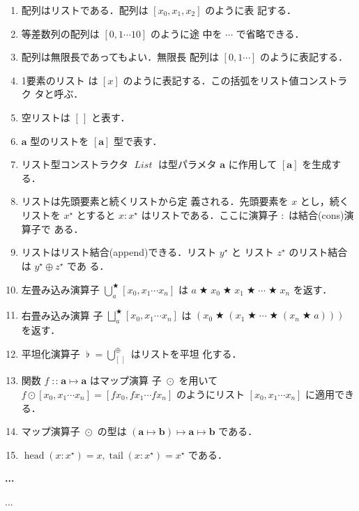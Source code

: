 \documentclass[a5paper,twoside,fleqn]{jsbook}
\newenvironment{note}[1]{\begin{boxnote}\begin{center}\textbf{#1}\end{center}}{\end{boxnote}}
\newcommand{\mEmptyList}{{[\,]}}
\newcommand{\mSpecialFunc}[1]{\mathrm{#1}}
\DeclareMathOperator{\mHead}{\mSpecialFunc{head}}
\DeclareMathOperator{\mTail}{\mSpecialFunc{tail}}
\DeclareMathOperator{\mAppend}{\oplus}
\DeclareMathOperator{\mBinOp}{\bigstar}
\DeclareMathOperator{\mConcat}{\flat}
\DeclareMathOperator*{\mFold}{\bigcup}
\DeclareMathOperator*{\mFoldRight}{\bigsqcup}
\DeclareMathOperator{\mIn}{{:\!:}}
\DeclareMathOperator{\mMapList}{\odot}
\DeclareMathOperator{\mMapsTo}{\mapsto}
\newcommand{\mType}[1]{\mathbf{#1}}
\newcommand{\mListType}[1]{[\mType{#1}]}
\newcommand{\mTypeConstructor}[1]{\textit{#1}}
\DeclareMathOperator{\mListTypeConstructor}{\mTypeConstructor{List}}
\newcommand{\mListWith}[1]{\left[#1\right]}
\newcommand{\mList}[1]{{#1}^\mathrm{\star}}
\newcommand{\mProj}[2]{#1\mMapsTo#2}
\begin{document}
\begin{enumerate}
\item 配列はリストである．配列は $\mListWith{x_0,x_1,x_2}$ のように表
  記する．\item 等差数列の配列は $\mListWith{0,1\dotsb10}$ のように途
  中を $\dotsb$ で省略できる．\item 配列は無限長であってもよい．無限長
  配列は $\mListWith{0,1\dotsb}$ のように表記する．\item 1要素のリスト
  は $\mListWith{x}$ のように表記する．この括弧をリスト値コンストラク
  タと呼ぶ．\item 空リストは $\mEmptyList$ と表す．\item $\mType{a}$
  型のリストを $\mListType{a}$ 型で表す．\item リスト型コンストラクタ
  $\mListTypeConstructor$ は型パラメタ $\mType{a}$ に作用して
  $\mListType{a}$ を生成する．\item リストは先頭要素と続くリストから定
  義される．先頭要素を $x$ とし，続くリストを $\mList{x}$ とすると
  $x:\mList{x}$ はリストである．ここに演算子 $:$ は結合(cons)演算子で
  ある．\item リストはリスト結合(append)できる．リスト $\mList{y}$ と
  リスト $\mList{z}$ のリスト結合は $\mList{y}\mAppend\mList{z}$ であ
  る．\item 左畳み込み演算子
  $\mFold^{\mBinOp}_a\mListWith{x_0,x_1\dotsb x_n}$ は $a\mBinOp
  x_0\mBinOp x_1\mBinOp\dotsb\mBinOp x_n$ を返す．\item 右畳み込み演算
  子 $\mFoldRight^{\mBinOp}_{a}\mListWith{x_0,x_1\dotsb x_n}$ は
  $(x_0\mBinOp(x_1\mBinOp\dotsb\mBinOp(x_n\mBinOp a)))$ を返す．\item
  平坦化演算子 $\mConcat=\mFold_\mEmptyList^{\mAppend}$ はリストを平坦
  化する．\item 関数 $f\mIn\mProj{\mType{a}}{\mType{a}}$ はマップ演算
  子 $\mMapList$ を用いて $f\mMapList\mListWith{x_0,x_1\dotsb
    x_n}=\mListWith{fx_0,fx_1\dotsb fx_n}$ のようにリスト
  $\mListWith{x_0,x_1\dotsb x_n}$ に適用できる．\item マップ演算子
  $\mMapList$ の型は
  $\mProj{(\mProj{\mType{a}}{\mType{b}})}{\mProj{\mType{a}}{\mType{b}}}$
  である．\item $\mHead(x:\mList{x})=x,\mTail(x:\mList{x})=\mList{x}$
  である．
\end{enumerate}


\begin{note}{...}
...
\end{note}
\end{document}
